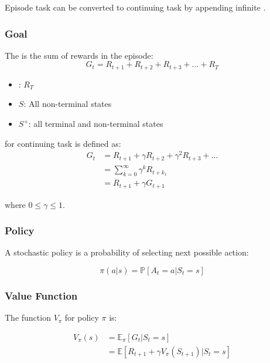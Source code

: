 Episode task can be converted to continuing task by appending infinite .


\subsubsection{Goal}
The  is the sum of rewards in the episode:
\begin{equation}
	G_t=R_{t+1}+R_{t+2} + R_{t+3} +\dots + R_T
\end{equation}

\begin{itemize}
	\item {}: $R_T$ 
	\item $S$: All non-terminal states
	\item $S^+$: all terminal and non-terminal states
\end{itemize}


 for continuing task is defined as:
\begin{equation}
	\begin{aligned}
		G_t&=R_{t+1}+\gamma R_{t+2} + \gamma^2 R_{t+3} + \dots  \\
		&= \sum_{k=0}^\infty \gamma^k R_{t+k_1} \\
		&= R_{t+1} + \gamma G_{t+1}
	\end{aligned}
\end{equation}

where $0 \leq \gamma \leq 1$.


\subsubsection{Policy}

A stochastic policy is a probability of selecting next possible action:

\begin{equation}
	\pi(a|s)=\mathbb{P}[A_t = a | S_t = s]
\end{equation}

\subsubsection{Value Function}

The  function $V_\pi$ for policy $\pi$ is:

\begin{equation}
	\begin{aligned}
		V_{\pi}(s) &= \mathbb{E}_{\pi}[G_t|S_t=s] \\
		&=\mathbb{E}[R_{t+1} + \gamma V_{\pi}(S_{t+1})| S_t = s]
	\end{aligned}
\end{equation}

